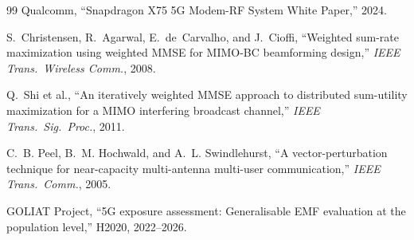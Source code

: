 \documentclass[journal,twoside,onecolumn]{IEEEtran}
\theoremstyle{definition}
\begin{document}
\begin{thebibliography}{99}
Qualcomm, ``Snapdragon X75 5G Modem-RF System White Paper,'' 2024.

S.~Christensen, R.~Agarwal, E.~de~Carvalho, and J.~Cioffi,
``Weighted sum-rate maximization using weighted MMSE for MIMO-BC
beamforming design,'' \emph{IEEE Trans.\ Wireless Comm.}, 2008.

Q.~Shi et al., ``An iteratively weighted MMSE approach to
distributed sum-utility maximization for a MIMO interfering broadcast
channel,'' \emph{IEEE Trans.\ Sig.\ Proc.}, 2011.

C.~B. Peel, B.~M. Hochwald, and A.~L. Swindlehurst, ``A vector-perturbation
technique for near-capacity multi-antenna multi-user communication,''
\emph{IEEE Trans.\ Comm.}, 2005.

GOLIAT Project, ``5G exposure assessment: Generalisable EMF
evaluation at the population level,'' H2020, 2022--2026.

\end{thebibliography}
\end{document}
